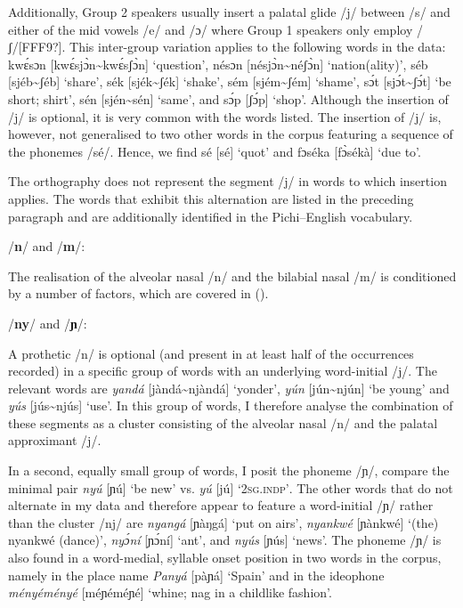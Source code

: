 Additionally, Group 2 speakers usually insert a palatal glide /j/ between /s/ and either of the mid vowels /e/ and /ɔ/ where Group 1 speakers only employ /ʃ/[FFF9?]. This inter-group variation applies to the following words in the data: kwɛ́sɔn [kwɛ́sjɔ̀n{\textasciitilde}kwɛ́sʃɔ̀n] ‘question’, nésɔn [nésjɔ̀n{\textasciitilde}néʃɔ̀n] ‘nation(ality)’, séb [sjéb{\textasciitilde}ʃéb] ‘share’, sék [sjék{\textasciitilde}ʃék] ‘shake’, sém [sjém{\textasciitilde}ʃém] ‘shame’, sɔ́t [sjɔ́t{\textasciitilde}ʃɔ́t] ‘be short; shirt’, sén [sjén{\textasciitilde}sén] ‘same’, and sɔ́p [ʃɔ́p] ‘shop’. Although the insertion of /j/ is optional, it is very common with the words listed. The insertion of /j/ is, however, not generalised to two other words in the corpus featuring a sequence of the phonemes /sé/. Hence, we find sé [sé] ‘quot’ and fɔséka [fɔ̀sékà] ‘due to’. 



The orthography does not represent the segment /j/ in words to which insertion applies. The words that exhibit this alternation are listed in the preceding paragraph and are additionally identified in the Pichi–English vocabulary. 


/\textbf{n}/ and /\textbf{m}/: 

The realisation of the alveolar nasal /n/ and the bilabial nasal /m/ is conditioned by a number of factors, which are covered in (). 

/\textbf{ny}/ and /\textbf{ɲ}/:

A prothetic /n/ is optional (and present in at least half of the occurrences recorded) in a specific group of words with an underlying word-initial /j/. The relevant words are\textit{ yandá} [jàndá{\textasciitilde}njàndá] ‘yonder’, \textit{yún} [jún{\textasciitilde}njún] ‘be young’ and \textit{yús} [jús{\textasciitilde}njús] ‘use’. In this group of words, I therefore analyse the combination of these segments as a cluster consisting of the alveolar nasal /n/ and the palatal approximant /j/. 


In a second, equally small group of words, I posit the phoneme /ɲ/, compare the minimal pair \textit{nyú} [ɲú] ‘be new’ vs. \textit{yú} [jú] \textsc{‘2sg.indp’}. The other words that do not alternate in my data and therefore appear to feature a word-initial /ɲ/ rather than the cluster /nj/ are \textit{nyangá} [ɲàŋgá] ‘put on airs’, \textit{nyankwé} [ɲànkwé] ‘(the) nyankwé (dance)’, \textit{nyɔ́ní} [ɲɔ́ní] ‘ant’, and \textit{nyús} [ɲús] ‘news’. The phoneme /ɲ/ is also found in a word-medial, syllable onset position in two words in the corpus, namely in the place name \textit{Panyá} [pàɲá] ‘Spain’ and in the ideophone \textit{ményéményé} [méɲéméɲé] ‘whine; nag in a childlike fashion’.



